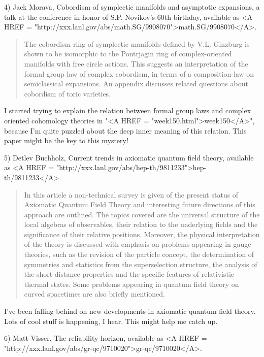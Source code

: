 4) Jack Morava, Cobordism of symplectic manifolds and asymptotic expansions,
a talk at the conference in honor of S.P. Novikov's 60th birthday, 
available as 
<A HREF = "http://xxx.lanl.gov/abs/math.SG/9908070">math.SG/9908070</A>.  

\begin{quote}
    The cobordism ring of symplectic manifolds defined by V.L. Ginzburg 
    is shown to be isomorphic to the Pontrjagin ring of complex-oriented 
    manifolds with free circle actions. This suggests an interpretation 
    of the formal group law of complex cobordism, in terms of a 
    composition-law on semiclassical expansions.  An appendix discusses 
    related questions about cobordism of toric varieties.
\end{quote}

I started trying to explain the relation between formal group laws and
complex oriented cohomology theories in "<A HREF =
"week150.html">week150</A>", because I'm quite puzzled about the
deep inner meaning of this relation.  This paper might be the key to
this mystery!

5) Detlev Buchholz, Current trends in axiomatic quantum field theory,
available as <A HREF =
"http://xxx.lanl.gov/abs/hep-th/9811233">hep-th/9811233</A>.

\begin{quote}
     In this article a non-technical survey is given of the present
     status of Axiomatic Quantum Field Theory and interesting future
     directions of this approach are outlined. The topics covered are
     the universal structure of the local algebras of observables, their
     relation to the underlying fields and the significance of their
     relative positions. Moreover, the physical interpretation of the
     theory is discussed with emphasis on problems appearing in gauge
     theories, such as the revision of the particle concept, the
     determination of symmetries and statistics from the superselection
     structure, the analysis of the short distance properties and the
     specific features of relativistic thermal states. Some problems
     appearing in quantum field theory on curved spacetimes are also
     briefly mentioned.

\end{quote}
I've been falling behind on new developments in axiomatic quantum field
theory.  Lots of cool stuff is happening, I hear.  This might help me
catch up.

6) Matt Visser, The reliability horizon, available as <A HREF = "http://xxx.lanl.gov/abs/gr-qc/9710020">gr-qc/9710020</A>.

